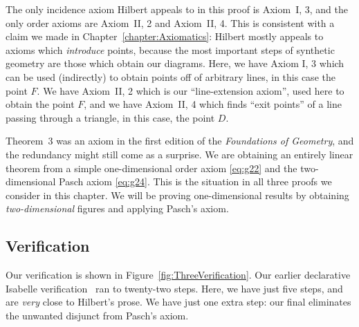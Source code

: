 The only incidence axiom Hilbert appeals to in this proof is Axiom~I, 3, and the only order axioms are Axiom~II, 2 and Axiom~II, 4. This is consistent with a claim we made in Chapter~\ref{chapter:Axiomatics}: Hilbert mostly appeals to axioms which \emph{introduce} points, because the most important steps of synthetic geometry are those which obtain our diagrams. Here, we have Axiom I, 3 which can be used (indirectly) to obtain points off of arbitrary lines, in this case the point $F$. We have Axiom~II, 2 which is our ``line-extension axiom'', used here to obtain the point $F$, and we have Axiom~II, 4 which finds ``exit points'' of a line passing through a triangle, in this case, the point $D$.

Theorem~3 was an axiom in the first edition of the \emph{Foundations of Geometry}, and the redundancy might still come as a surprise. We are obtaining an entirely linear theorem from a simple one-dimensional order axiom \eqref{eq:g22} and the two-dimensional Pasch axiom \eqref{eq:g24}. This is the situation in all three proofs we consider in this chapter. We will be proving one-dimensional results by obtaining \emph{two-dimensional} figures and applying Pasch's axiom.

\subsection{Verification}
Our verification is shown in Figure~\ref{fig:ThreeVerification}. Our earlier declarative Isabelle verification~\cite{ScottMScThesis} ran to twenty-two steps. Here, we have just five steps, and are \emph{very} close to Hilbert's prose. We have just one extra step: our final  eliminates the unwanted disjunct from Pasch's axiom. 

